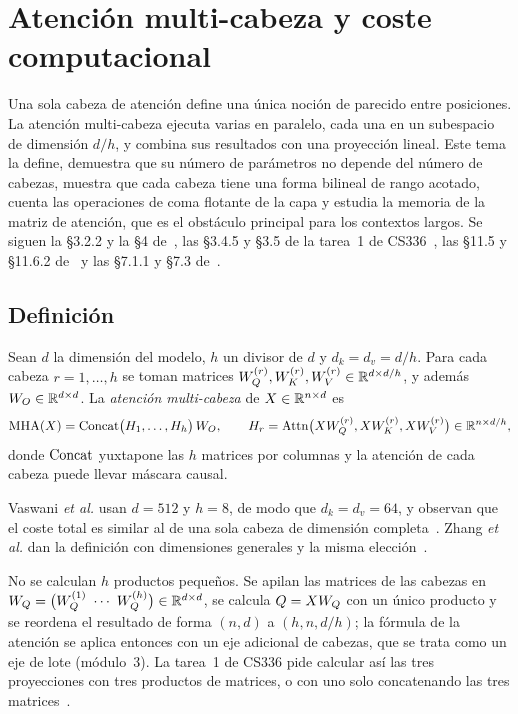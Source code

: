\chapter{Atención multi-cabeza y coste computacional}
\label{tema:4}

Una sola cabeza de atención define una única noción de parecido entre posiciones. La atención multi-cabeza ejecuta varias en paralelo, cada una en un subespacio de dimensión $d/h$, y combina sus resultados con una proyección lineal. Este tema la define, demuestra que su número de parámetros no depende del número de cabezas, muestra que cada cabeza tiene una forma bilineal de rango acotado, cuenta las operaciones de coma flotante de la capa y estudia la memoria de la matriz de atención, que es el obstáculo principal para los contextos largos. Se siguen la §3.2.2 y la §4 de~\cite{vaswani}, las §3.4.5 y §3.5 de la tarea~1 de CS336~\cite{cs336}, las §11.5 y §11.6.2 de~\cite{d2l} y las §7.1.1 y §7.3 de~\cite{jm3}.

\section{Definición}

\begin{definicion}\label{def:mha}
Sean $d$ la dimensión del modelo, $h$ un divisor de $d$ y $d_k=d_v=d/h$. Para cada cabeza $r=1,\dots,h$ se toman matrices $W_{Q}^{(r)},W_{K}^{(r)},W_{V}^{(r)}\in\mathbb{R}^{d\times d/h}$, y además $W_{O}\in\mathbb{R}^{d\times d}$. La \emph{atención multi-cabeza} de $X\in\mathbb{R}^{n\times d}$ es
\[
\operatorname{MHA}(X)=\operatorname{Concat}\bigl(H_1,\dots,H_h\bigr)\,W_{O},\qquad
H_r=\operatorname{Attn}\bigl(XW_{Q}^{(r)},XW_{K}^{(r)},XW_{V}^{(r)}\bigr)\in\mathbb{R}^{n\times d/h},
\]
donde $\operatorname{Concat}$ yuxtapone las $h$ matrices por columnas y la atención de cada cabeza puede llevar máscara causal.
\end{definicion}

Vaswani \emph{et al.} usan $d=512$ y $h=8$, de modo que $d_k=d_v=64$, y observan que el coste total es similar al de una sola cabeza de dimensión completa~\cite[§3.2.2]{vaswani}. Zhang \emph{et al.} dan la definición con dimensiones generales y la misma elección~\cite[§11.5.1]{d2l}.

\addtocounter{figure}{1}%

\begin{observacion}[Implementación]
No se calculan $h$ productos pequeños. Se apilan las matrices de las cabezas en $\WQ=\bigl(\WQ^{(1)}\ \cdots\ \WQ^{(h)}\bigr)\in\R^{d\times d}$, se calcula $Q=XW_{Q}$ con un único producto y se reordena el resultado de forma $(n,d)$ a $(h,n,d/h)$; la fórmula de la atención se aplica entonces con un eje adicional de cabezas, que se trata como un eje de lote (módulo~3). La tarea~1 de CS336 pide calcular así las tres proyecciones con tres productos de matrices, o con uno solo concatenando las tres matrices~\cite[§3.4.5]{cs336}.
\end{observacion}


